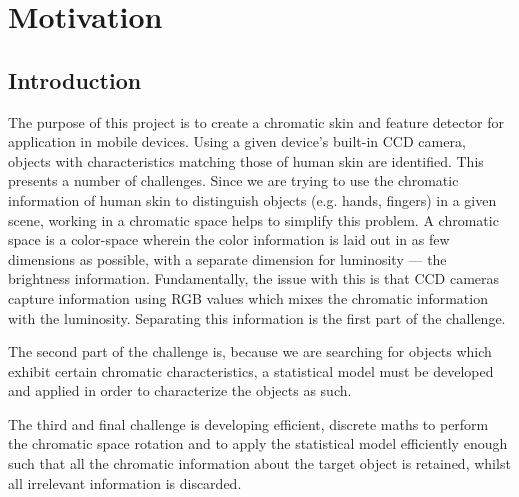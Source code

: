 
\chapter{Motivation}  %

\ifpdf
    \graphicspath{{Chapter1/Figs/Raster/}{Chapter1/Figs/PDF/}{Chapter1/Figs/}}
\else
    \graphicspath{{Chapter1/Figs/Vector/}{Chapter1/Figs/}}
\fi

\section{Introduction}\label{sec:Introduction}

The purpose of this project is to create a chromatic skin and feature detector for application in mobile devices. Using a given device's built-in CCD camera, objects with characteristics matching those of human skin are identified. This presents a number of challenges. Since we are trying to use the chromatic information of human skin to distinguish objects (e.g. hands, fingers) in a given scene, working in a chromatic space helps to simplify this problem. A chromatic space is a color-space wherein the color information is laid out in as few dimensions as possible, with a separate dimension for luminosity --- the brightness information. Fundamentally, the issue with this is that CCD cameras capture information using RGB values which mixes the chromatic information with the luminosity. Separating this information is the first part of the challenge.

The second part of the challenge is, because we are searching for objects which exhibit certain chromatic characteristics, a statistical model must be developed and applied in order to characterize the objects as such.

The third and final challenge is developing efficient, discrete maths to perform the chromatic space rotation and to apply the statistical model efficiently enough such that all the chromatic information about the target object is retained, whilst all irrelevant information is discarded.

